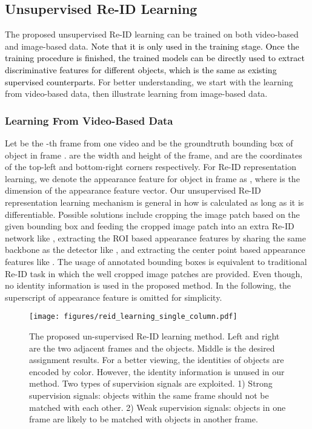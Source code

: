\documentclass[final,1p,times,twocolumn]{elsarticle}
\newcommand{\qiankun}[1]{\textcolor{black}{#1}}
\begin{document}
	
	
	\subsection{Unsupervised Re-ID Learning}
	The proposed unsupervised Re-ID learning can be trained on both video-based and image-based data. \qiankun{Note that it is only used in the training stage. Once the training procedure is finished, the trained models can be directly used to extract discriminative features for different objects, which is the same as existing supervised counterparts.}
	For better understanding, we start with the learning from video-based data, then illustrate learning from image-based data. 
	
	\subsubsection{Learning From Video-Based Data}
	Let  be the -th frame from one video and    be the groundtruth bounding box of object  in frame .  are the width and height of the frame, and  are the coordinates of the top-left and bottom-right corners respectively. For Re-ID representation learning, we denote the appearance feature for object  in frame  as , where  is the dimension of the appearance feature vector. Our unsupervised Re-ID representation learning mechanism is general in how  is calculated as long as it is differentiable. Possible solutions include cropping the image patch based on the given bounding box and feeding the cropped image patch into an extra Re-ID network like \cite{wang2020cycas, bergmann2019tracking, liugsm}, extracting the ROI based appearance features by sharing the same backbone as the detector like \cite{wang2019towards, voigtlaender2019mots}, and extracting the center point based appearance features like \cite{zhang2020fairmot}. The usage of annotated bounding boxes is equivalent to traditional Re-ID task in which the well cropped image patches are provided. Even though, no identity information is used in the proposed method.  In the following, the superscript  of appearance feature is omitted for simplicity.
	
	
	\begin{figure*}[t]
		\centering
		\texttt{[image: figures/reid\_learning\_single\_column.pdf]} 
		\caption{The proposed un-supervised Re-ID learning method. Left and right are the two adjacent frames and the objects. Middle is the desired assignment results. For a better viewing, the identities of objects are encoded by color. However, the identity information is unused in our method. Two types of supervision signals are exploited. 1) Strong supervision signals: objects within the same frame should not be matched with each other. 2) Weak supervision signals: objects in one frame are likely to be matched with objects in another frame.}
		\label{fig_reid_learning}
	\end{figure*}
	
\end{document}
